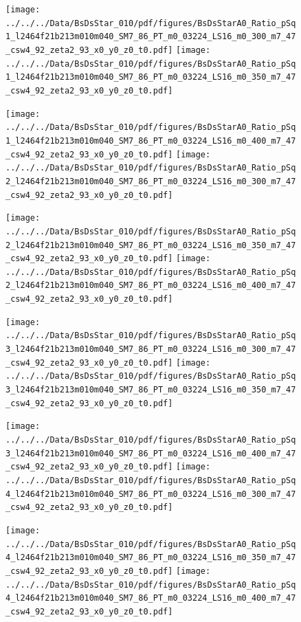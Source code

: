 \documentclass[a4paper,10pt]{article}
\begin{document}
\begin{figure}[p]
 \texttt{[image: ../../../Data/BsDsStar\_010/pdf/figures/BsDsStarA0\_Ratio\_pSq1\_l2464f21b213m010m040\_SM7\_86\_PT\_m0\_03224\_LS16\_m0\_300\_m7\_47\_csw4\_92\_zeta2\_93\_x0\_y0\_z0\_t0.pdf]} 
 \texttt{[image: ../../../Data/BsDsStar\_010/pdf/figures/BsDsStarA0\_Ratio\_pSq1\_l2464f21b213m010m040\_SM7\_86\_PT\_m0\_03224\_LS16\_m0\_350\_m7\_47\_csw4\_92\_zeta2\_93\_x0\_y0\_z0\_t0.pdf]} 
 \end{figure}
\begin{figure}[p]
 \texttt{[image: ../../../Data/BsDsStar\_010/pdf/figures/BsDsStarA0\_Ratio\_pSq1\_l2464f21b213m010m040\_SM7\_86\_PT\_m0\_03224\_LS16\_m0\_400\_m7\_47\_csw4\_92\_zeta2\_93\_x0\_y0\_z0\_t0.pdf]} 
 \texttt{[image: ../../../Data/BsDsStar\_010/pdf/figures/BsDsStarA0\_Ratio\_pSq2\_l2464f21b213m010m040\_SM7\_86\_PT\_m0\_03224\_LS16\_m0\_300\_m7\_47\_csw4\_92\_zeta2\_93\_x0\_y0\_z0\_t0.pdf]} 
 \end{figure}
\begin{figure}[p]
 \texttt{[image: ../../../Data/BsDsStar\_010/pdf/figures/BsDsStarA0\_Ratio\_pSq2\_l2464f21b213m010m040\_SM7\_86\_PT\_m0\_03224\_LS16\_m0\_350\_m7\_47\_csw4\_92\_zeta2\_93\_x0\_y0\_z0\_t0.pdf]} 
 \texttt{[image: ../../../Data/BsDsStar\_010/pdf/figures/BsDsStarA0\_Ratio\_pSq2\_l2464f21b213m010m040\_SM7\_86\_PT\_m0\_03224\_LS16\_m0\_400\_m7\_47\_csw4\_92\_zeta2\_93\_x0\_y0\_z0\_t0.pdf]} 
 \end{figure}
\clearpage
\begin{figure}[p]
 \texttt{[image: ../../../Data/BsDsStar\_010/pdf/figures/BsDsStarA0\_Ratio\_pSq3\_l2464f21b213m010m040\_SM7\_86\_PT\_m0\_03224\_LS16\_m0\_300\_m7\_47\_csw4\_92\_zeta2\_93\_x0\_y0\_z0\_t0.pdf]} 
 \texttt{[image: ../../../Data/BsDsStar\_010/pdf/figures/BsDsStarA0\_Ratio\_pSq3\_l2464f21b213m010m040\_SM7\_86\_PT\_m0\_03224\_LS16\_m0\_350\_m7\_47\_csw4\_92\_zeta2\_93\_x0\_y0\_z0\_t0.pdf]} 
 \end{figure}
\begin{figure}[p]
 \texttt{[image: ../../../Data/BsDsStar\_010/pdf/figures/BsDsStarA0\_Ratio\_pSq3\_l2464f21b213m010m040\_SM7\_86\_PT\_m0\_03224\_LS16\_m0\_400\_m7\_47\_csw4\_92\_zeta2\_93\_x0\_y0\_z0\_t0.pdf]} 
 \texttt{[image: ../../../Data/BsDsStar\_010/pdf/figures/BsDsStarA0\_Ratio\_pSq4\_l2464f21b213m010m040\_SM7\_86\_PT\_m0\_03224\_LS16\_m0\_300\_m7\_47\_csw4\_92\_zeta2\_93\_x0\_y0\_z0\_t0.pdf]} 
 \end{figure}
\begin{figure}[p]
 \texttt{[image: ../../../Data/BsDsStar\_010/pdf/figures/BsDsStarA0\_Ratio\_pSq4\_l2464f21b213m010m040\_SM7\_86\_PT\_m0\_03224\_LS16\_m0\_350\_m7\_47\_csw4\_92\_zeta2\_93\_x0\_y0\_z0\_t0.pdf]} 
 \texttt{[image: ../../../Data/BsDsStar\_010/pdf/figures/BsDsStarA0\_Ratio\_pSq4\_l2464f21b213m010m040\_SM7\_86\_PT\_m0\_03224\_LS16\_m0\_400\_m7\_47\_csw4\_92\_zeta2\_93\_x0\_y0\_z0\_t0.pdf]} 
 \end{figure}
\end{document}
